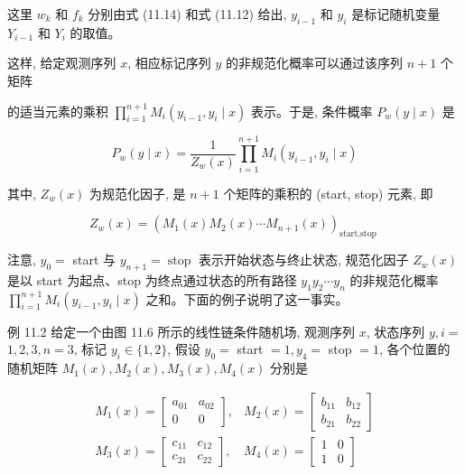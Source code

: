 \documentclass[10pt]{article}
\begin{document}
\begin{CJK*}{UTF8}{bsmi}
这里 $w_{k}$ 和 $f_{k}$ 分别由式 (11.14) 和式 (11.12) 给出, $y_{i-1}$ 和 $y_{i}$ 是标记随机变量 $Y_{i-1}$ 和 $Y_{i}$ 的取值。

这样, 给定观测序列 $x$, 相应标记序列 $y$ 的非规范化概率可以通过该序列 $n+1$ 个矩阵

的适当元素的乘积 $\prod_{i=1}^{n+1} M_{i}\left(y_{i-1}, y_{i} \mid x\right)$ 表示。于是, 条件概率 $P_{w}(y \mid x)$ 是


\begin{equation*}
P_{w}(y \mid x)=\frac{1}{Z_{w}(x)} \prod_{i=1}^{n+1} M_{i}\left(y_{i-1}, y_{i} \mid x\right) \tag{11.24}
\end{equation*}


其中, $Z_{w}(x)$ 为规范化因子, 是 $n+1$ 个矩阵的乘积的 (start, stop) 元素, 即


\begin{equation*}
Z_{w}(x)=\left(M_{1}(x) M_{2}(x) \cdots M_{n+1}(x)\right)_{\text {start,stop }} \tag{11.25}
\end{equation*}


注意, $y_{0}=$ start 与 $y_{n+1}=\operatorname{stop}$ 表示开始状态与终止状态, 规范化因子 $Z_{w}(x)$ 是以 start 为起点、stop 为终点通过状态的所有路径 $y_{1} y_{2} \cdots y_{n}$ 的非规范化概率 $\prod_{i=1}^{n+1} M_{i}\left(y_{i-1}, y_{i} \mid x\right)$ 之和。下面的例子说明了这一事实。

例 11.2 给定一个由图 11.6 所示的线性链条件随机场, 观测序列 $x$, 状态序列 $y, i=$ $1,2,3, n=3$, 标记 $y_{i} \in\{1,2\}$, 假设 $y_{0}=$ start $=1, y_{4}=$ stop $=1$, 各个位置的随机矩阵 $M_{1}(x), M_{2}(x), M_{3}(x), M_{4}(x)$ 分别是

$$
\begin{array}{ll}
M_{1}(x)=\left[\begin{array}{cc}
a_{01} & a_{02} \\
0 & 0
\end{array}\right], & M_{2}(x)=\left[\begin{array}{ll}
b_{11} & b_{12} \\
b_{21} & b_{22}
\end{array}\right] \\
M_{3}(x)=\left[\begin{array}{cc}
c_{11} & c_{12} \\
c_{21} & c_{22}
\end{array}\right], & M_{4}(x)=\left[\begin{array}{ll}
1 & 0 \\
1 & 0
\end{array}\right]
\end{array}
$$


\end{CJK*}
\end{document}
